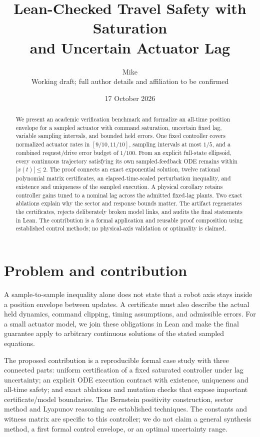 \documentclass[10pt]{article}
\title{Lean-Checked Travel Safety with Saturation\\and Uncertain Actuator Lag}
\author{Mike\\\small Working draft; full author details and affiliation to be confirmed}
\date{17 October 2026}
\begin{document}
\maketitle
\begin{abstract}
We present an academic verification benchmark and formalize an all-time position envelope for a sampled actuator with command saturation, uncertain fixed lag, variable sampling intervals, and bounded held errors. One fixed controller covers normalized actuator rates in $[9/10,11/10]$, sampling intervals at most $1/5$, and a combined request/drive error budget of $1/100$. From an explicit full-state ellipsoid, every continuous trajectory satisfying its own sampled-feedback ODE remains within $|x(t)|\le2$. The proof connects an exact exponential solution, twelve rational polynomial matrix certificates, an elapsed-time-scaled perturbation inequality, and existence and uniqueness of the sampled execution. A physical corollary retains controller gains tuned to a nominal lag across the admitted fixed-lag plants. Two exact ablations explain why the sector and response bounds matter. The artifact regenerates the certificates, rejects deliberately broken model links, and audits the final statements in Lean. The contribution is a formal application and reusable proof composition using established control methods; no physical-axis validation or optimality is claimed.
\end{abstract}

\section{Problem and contribution}
A sample-to-sample inequality alone does not state that a robot axis stays inside a position envelope between updates. A certificate must also describe the actual held dynamics, command clipping, timing assumptions, and admissible errors. For a small actuator model, we join these obligations in Lean and make the final guarantee apply to arbitrary continuous solutions of the stated sampled equations.

The proposed contribution is a reproducible formal case study with three connected parts: uniform certification of a fixed saturated controller under lag uncertainty; an explicit ODE execution contract with existence, uniqueness and all-time safety; and exact ablations and mutation checks that expose important certificate/model boundaries. The Bernstein positivity construction, sector method and Lyapunov reasoning are established techniques. The constants and witness matrix are specific to this controller; we do not claim a general synthesis method, a first formal control envelope, or an optimal uncertainty range.
\end{document}
